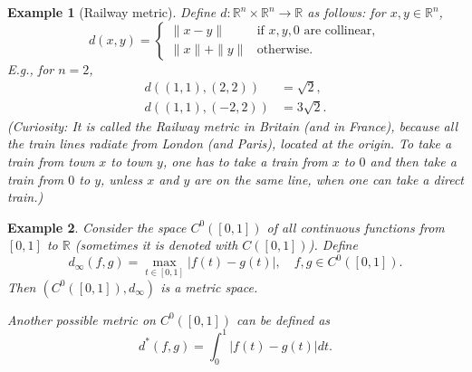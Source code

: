 \documentclass[a4paper,reqno]{amsart}
\numberwithin{equation}{section}
\newtheorem{example}{Example}
\def\R{\mathbb{R}}
\begin{document}
\begin{example}[Railway metric]\label{railway}
Define $d : \R^n \times \R^n \to \R$ as follows: for $x,y \in \R^n$,
\[
d(x,y) = \begin{cases} \|x - y\| & \text{if $x,y,0$ are collinear}, \\ \|x\| + \|y\| & \text{otherwise}. \end{cases}
\]
E.g., for $n = 2$,
\begin{align*}
d((1,1),(2,2)) & = \sqrt{2}, \\
d((1,1),(-2,2)) & = 3\sqrt{2}.
\end{align*}
(\textit{Curiosity:} It is called the Railway metric in Britain (and in France), because all the train lines radiate from London (and Paris), located at the origin. To take a train from town $x$ to town $y$, one has to take a train from $x$ to $0$ and then take a train from $0$ to $y$, unless $x$ and $y$ are on the same line, when one can take a direct train.)

\medskip


%
%
\end{example}



\begin{example}\label{continuous_functions}
Consider the space $C^0([0,1])$ of all continuous functions from $[0,1]$ to $\R$ (sometimes it is denoted with $C([0,1])$).
Define
\[
d_\infty(f,g) = \max_{t \in [0,1]} |f(t) - g(t)|, \quad f,g \in C^0([0,1]).
\]
Then $(C^0([0,1]),d_\infty)$ is a metric space.

\quad

Another possible metric on $C^0([0,1])$ can be defined as
$$
d^\ast(f,g) = \int_0^1|f(t)-g(t)|dt.
$$

\end{example}
\end{document}
